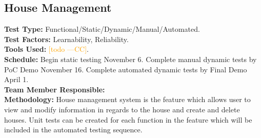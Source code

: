 \documentclass[12pt]{article}
\newcommand{\authornote}[3]{\textcolor{#1}{[#3 ---#2]}}
\newcommand{\authornote}[3]{}
\newcommand{\cc}[1]{\authornote{orange}{CC}{#1}}
\begin{document}
\subsection{House Management}
\textbf{Test Type:} Functional/Static/Dynamic/Manual/Automated. \\
\textbf{Test Factors:} Learnability, Reliability. \\
\textbf{Tools Used:} \cc{todo}. \\
\textbf{Schedule:} Begin static testing November 6. Complete manual dynamic tests by PoC Demo November 16. Complete automated dynamic tests by Final Demo April 1. \\
\textbf{Team Member Responsible:} \\
\textbf{Methodology:} House management system is the feature which allows user to view and modify information in regards to the house and create and delete houses. Unit tests can be created for each function in the feature which will be included in the automated testing sequence.
\end{document}
